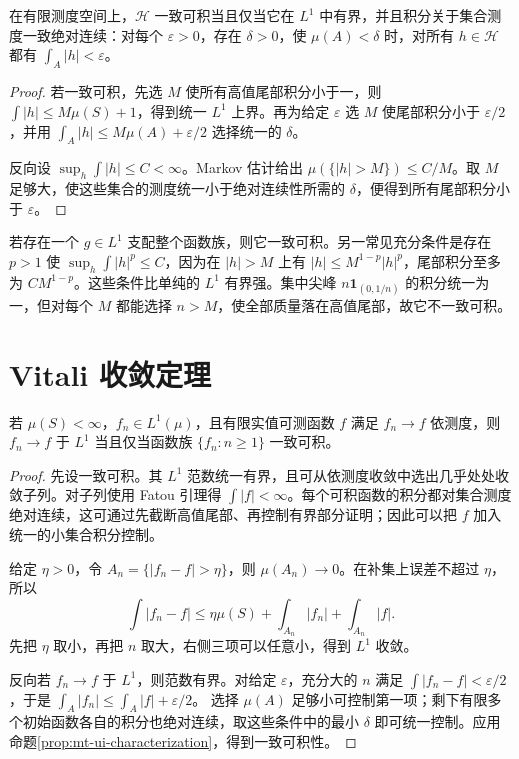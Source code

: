 \begin{proposition}[一致可积性的等价判别]
在有限测度空间上，$\mathcal H$ 一致可积当且仅当它在 $L^1$ 中有界，并且积分关于集合测度一致绝对连续：对每个 $\varepsilon>0$，存在 $\delta>0$，使 $\mu(A)<\delta$ 时，对所有 $h\in\mathcal H$ 都有 $\int_A|h|<\varepsilon$。
\label{prop:mt-ui-characterization}
\end{proposition}
\begin{proof}
若一致可积，先选 $M$ 使所有高值尾部积分小于一，则
$\int|h|\leq M\mu(S)+1$，得到统一 $L^1$ 上界。再为给定 $\varepsilon$ 选 $M$ 使尾部积分小于 $\varepsilon/2$，并用
$\int_A|h|\leq M\mu(A)+\varepsilon/2$
选择统一的 $\delta$。

反向设 $\sup_h\int|h|\leq C<\infty$。Markov 估计给出
$\mu(\{|h|>M\})\leq C/M$。取 $M$ 足够大，使这些集合的测度统一小于绝对连续性所需的 $\delta$，便得到所有尾部积分小于 $\varepsilon$。
\end{proof}
若存在一个 $g\in L^1$ 支配整个函数族，则它一致可积。另一常见充分条件是存在 $p>1$ 使 $\sup_h\int|h|^p\leq C$，因为在 $|h|>M$ 上有 $|h|\leq M^{1-p}|h|^p$，尾部积分至多为 $CM^{1-p}$。这些条件比单纯的 $L^1$ 有界强。集中尖峰 $n\mathbf1_{(0,1/n)}$ 的积分统一为一，但对每个 $M$ 都能选择 $n>M$，使全部质量落在高值尾部，故它不一致可积。

\section{Vitali 收敛定理}
\begin{theorem}
若 $\mu(S)<\infty$，$f_n\in L^1(\mu)$，且有限实值可测函数 $f$ 满足 $f_n\to f$ 依测度，则 $f_n\to f$ 于 $L^1$ 当且仅当函数族 $\{f_n:n\geq1\}$ 一致可积。
\label{thm:mt-vitali-convergence}
\end{theorem}
\begin{proof}
先设一致可积。其 $L^1$ 范数统一有界，且可从依测度收敛中选出几乎处处收敛子列。对子列使用 Fatou 引理得 $\int|f|<\infty$。每个可积函数的积分都对集合测度绝对连续，这可通过先截断高值尾部、再控制有界部分证明；因此可以把 $f$ 加入统一的小集合积分控制。

给定 $\eta>0$，令 $A_n=\{|f_n-f|>\eta\}$，则 $\mu(A_n)\to0$。在补集上误差不超过 $\eta$，所以
\[
 \int|f_n-f|
 \leq\eta\mu(S)+\int_{A_n}|f_n|+\int_{A_n}|f|.
\]
先把 $\eta$ 取小，再把 $n$ 取大，右侧三项可以任意小，得到 $L^1$ 收敛。

反向若 $f_n\to f$ 于 $L^1$，则范数有界。对给定 $\varepsilon$，充分大的 $n$ 满足 $\int|f_n-f|<\varepsilon/2$，于是
$\int_A|f_n|\leq\int_A|f|+\varepsilon/2$。
选择 $\mu(A)$ 足够小可控制第一项；剩下有限多个初始函数各自的积分也绝对连续，取这些条件中的最小 $\delta$ 即可统一控制。应用命题\ref{prop:mt-ui-characterization}，得到一致可积性。
\end{proof}

